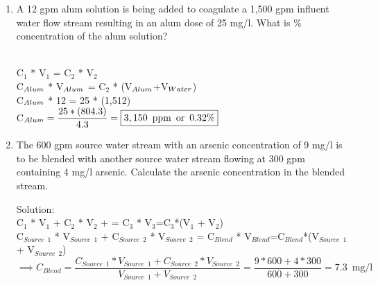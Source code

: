 \documentclass{article}
\begin{document}
 


\begin{enumerate}

\item A 12 gpm alum solution is being added to coagulate a 1,500 gpm influent water flow stream resulting in an alum dose of 25 mg/l.  What is \% concentration of the alum solution?

\vspace{0.3cm}
\\
\vspace{0.2cm}
C$_1$ * V$_1$ = C$_2$ * V$_2$ \\
\vspace{0.2cm}
C$_{\tiny{Alum}}$ * V$_{\tiny{Alum}}$  =  C$_2$ * (V$_{\tiny{Alum}}$+V$_{\tiny{Water}}$)\\
\vspace{0.2cm}
C$_{\tiny{Alum}}$ * 12 =  25 * (1,512)\\
\vspace{0.2cm}
C$_{\tiny{Alum}}=\dfrac{25 * (804.3)}{4.3}=\boxed{3,150 \enspace \mathrm{ppm} \enspace \mathrm{or} \enspace 0.32\%}$\\
\vspace{0.3cm}
\newpage
\item The 600 gpm source water stream with an arsenic concentration of 9 mg/l is to be blended with another source water stream flowing at 300 gpm containing 4 mg/l arsenic.  Calculate the arsenic concentration in the blended stream.

Solution:\\
\vspace{0.2cm}
C$_1$ * V$_1$ + C$_2$ * V$_2$ + =  C$_3$ * V$_3$=C$_3$*(V$_1$ + V$_2$)\\
\vspace{0.2cm}
C$_{Source \enspace 1}$ * V$_{Source \enspace 1}$ + C$_{Source \enspace 2}$ * V$_{Source \enspace 2}$ =  C$_{Blend}$ * V$_{Blend}$=C$_{Blend}$*(V$_{Source \enspace1}$ + V$_{Source \enspace 2}$)\\
\vspace{0.3cm}
$\implies C_{Blend}=\dfrac{C_{Source \enspace 1} * V_{Source \enspace 1} + C_{Source \enspace 2} * V_{Source \enspace 2}}{V_{Source \enspace 1} + V_{Source \enspace 2}}=\dfrac{9*600+4*300}{600+300}=\boxed{7.3 \enspace \textrm{mg/l}}$


\end{enumerate}
\end{document}
